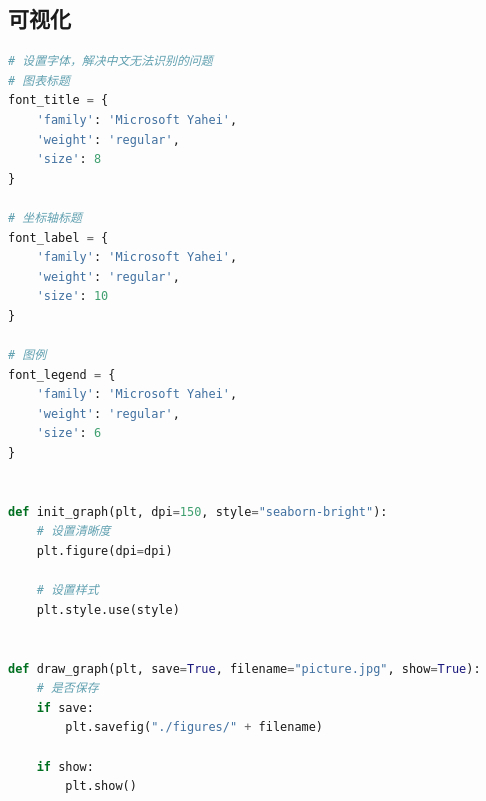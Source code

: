 \documentclass[withoutpreface,bwprint]{cumcmthesis}
\begin{document}
\begin{appendix}
\section{可视化}
\begin{lstlisting}[language=python]
# 设置字体，解决中文无法识别的问题
# 图表标题
font_title = {
    'family': 'Microsoft Yahei',
    'weight': 'regular',
    'size': 8
}

# 坐标轴标题
font_label = {
    'family': 'Microsoft Yahei',
    'weight': 'regular',
    'size': 10
}

# 图例
font_legend = {
    'family': 'Microsoft Yahei',
    'weight': 'regular',
    'size': 6
}


def init_graph(plt, dpi=150, style="seaborn-bright"):
    # 设置清晰度
    plt.figure(dpi=dpi)

    # 设置样式
    plt.style.use(style)


def draw_graph(plt, save=True, filename="picture.jpg", show=True):
    # 是否保存
    if save:
        plt.savefig("./figures/" + filename)

    if show:
        plt.show()
\end{lstlisting}
\end{appendix}
\end{document}

